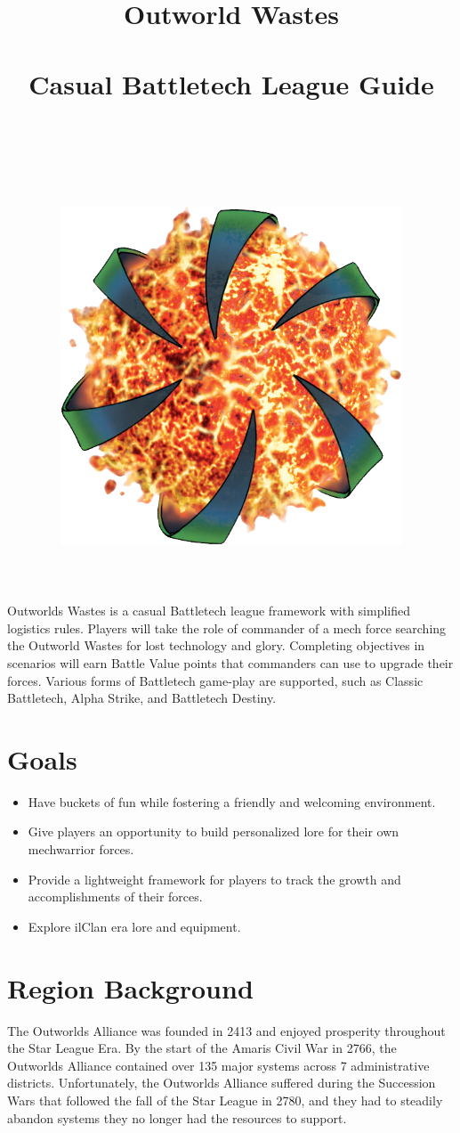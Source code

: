 \documentclass[UTF8]{article}
\title{
  Outworld Wastes\\
  ~\\
  \large Casual Battletech League Guide \\
  ~\\
  ~\\
  ~\\
  \includegraphics[width=4in]{img/Outworlds_Alliance.png}
}
\author{}
\date{}
\begin{document}
\maketitle

\newpage

Outworlds Wastes is a casual Battletech league framework with simplified logistics rules.
Players will take the role of commander of a mech force searching the Outworld Wastes for lost technology and glory.
Completing objectives in scenarios will earn Battle Value points that commanders can use to upgrade their forces.
Various forms of Battletech game-play are supported, such as Classic Battletech, Alpha Strike, and Battletech Destiny.\\

\section*{Goals}

\begin{itemize}

\item Have buckets of fun while fostering a friendly and welcoming environment.

\item Give players an opportunity to build personalized lore for their own mechwarrior forces.

\item Provide a lightweight framework for players to track the growth and accomplishments of their forces.

\item Explore ilClan era lore and equipment.

\end{itemize}

\newpage

\section{Region Background}

The Outworlds Alliance was founded in 2413 and enjoyed prosperity throughout the Star League Era.
By the start of the Amaris Civil War in 2766, the Outworlds Alliance contained over 135 major systems across 7 administrative districts.
Unfortunately, the Outworlds Alliance suffered during the Succession Wars that followed the fall of the Star League in 2780, and they had to steadily abandon systems they no longer had the resources to support.\\
\end{document}
